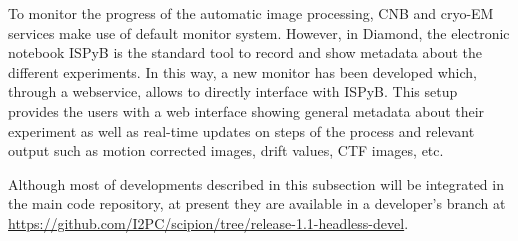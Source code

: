 

To monitor the progress of the automatic image processing, CNB and \scilifelab cryo-EM services make use of \scipion default monitor system. However, in Diamond, the electronic notebook ISPyB is the standard tool to record and show metadata about the different experiments. In this way, a new monitor has been developed which, through a webservice, allows \scipion to directly interface with ISPyB.  This setup provides the users with a web interface showing general metadata about their experiment as well as  real-time updates on steps of the process and relevant output such as motion corrected images, drift values, CTF images, etc.

Although most of developments described in this subsection will be integrated in the main \scipion code repository, at present they are available in a developer's branch  at \url{https://github.com/I2PC/scipion/tree/release-1.1-headless-devel}.
